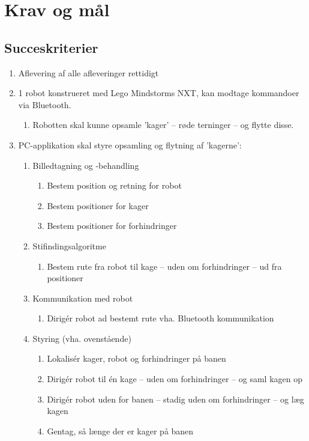 \section{Krav og mål}
\subsection{Succeskriterier}
\begin{enumerate}
	\item Aflevering af alle afleveringer rettidigt
	\item 1 robot konstrueret med Lego Mindstorms NXT, kan modtage kommandoer via Bluetooth.
	\begin{enumerate}
		\item Robotten skal kunne opsamle 'kager' -- røde terninger -- og flytte disse.
	\end{enumerate}
	\item PC-applikation skal styre opsamling og flytning af 'kagerne':
	\begin{enumerate}
		\item Billedtagning og -behandling
		\begin{enumerate}
			\item Bestem position og retning for robot
			\item Bestem positioner for kager
			\item Bestem positioner for forhindringer
		\end{enumerate}
		\item Stifindingsalgoritme
		\begin{enumerate}
			\item Bestem rute fra robot til kage -- uden om forhindringer -- ud fra positioner
		\end{enumerate}
		\item Kommunikation med robot
		\begin{enumerate}
			\item Dirigér robot ad bestemt rute vha. Bluetooth kommunikation
		\end{enumerate}
		\item Styring (vha. ovenstående)
		\begin{enumerate}
			\item Lokalisér kager, robot og forhindringer på banen
			\item Dirigér robot til én kage -- uden om forhindringer -- og saml kagen op
			\item Dirigér robot uden for banen -- stadig uden om forhindringer -- og læg kagen
			\item Gentag, så længe der er kager på banen
		\end{enumerate}
	\end{enumerate}
\end{enumerate}

